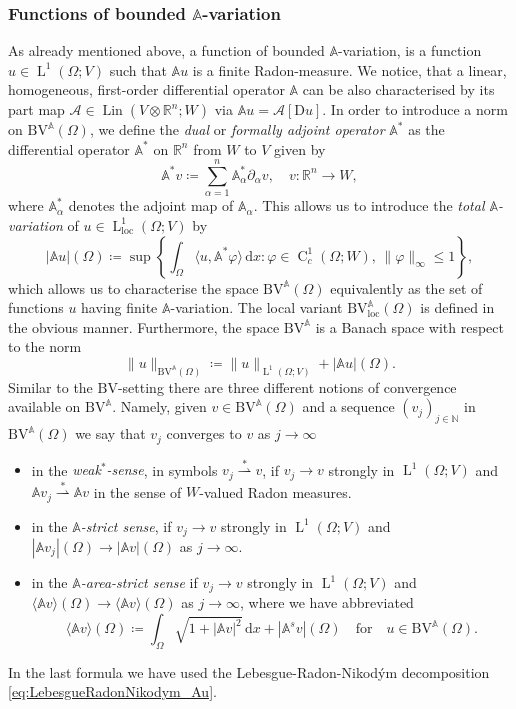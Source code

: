 \documentclass[a4paper,10pt,reqno,oneside]{amsart}
\numberwithin{equation}{section}
\newcommand{\R}{\mathbb R}
\newcommand{\N}{\mathbb N}
\newcommand{\A}{\mathscr{A}}
\newcommand{\Aop}{\mathbb{A}}
\newcommand{\lebe}{\operatorname{L}}
\newcommand{\hold}{\operatorname{C}}
\newcommand{\BV}{\mathrm{BV}}
\newcommand{\loc}{\mathrm{loc}}
\newcommand{\D}{\mathrm{D}}
\DeclareMathOperator{\Lin}{Lin}
\newcommand{\dx}[1]{\,\mathrm{d}#1}
\newcommand{\del}{\partial}
\newcommand{\abs}[1]{\left\lvert#1\right\rvert}
\newcommand{\weakstar}{\overset{\ast}{\rightharpoonup}}
\begin{document}
\subsubsection{Functions of bounded $\Aop$-variation}
As already mentioned above, a function of bounded $\Aop$-variation, is a function $u\in\lebe^1(\Omega;V)$ such that $\Aop u$ is a finite Radon-measure. We notice, that a linear, homogeneous, first-order differential operator $\Aop$ can be also characterised by its part map $\A\in\Lin(V\otimes \R^n; W)$ via $\Aop u = \A[\D u ]$. 
In order to introduce a norm on $\BV^\Aop(\Omega)$, we define the \emph{dual} or \emph{formally adjoint operator} $\Aop^\ast$ as the differential operator $\Aop^\ast$ on $\R^n$ from $W$ to $V$ given by
\begin{equation*}
	\Aop^\ast v\coloneqq\sum_{\alpha=1}^n \Aop_\alpha^\ast \del_\alpha v,\quad v\colon \R^n\to W,
\end{equation*}
where $\Aop_\alpha^\ast$ denotes the adjoint map of $\Aop_\alpha$. This allows us to introduce the \emph{total \(\Aop\)-variation} of \(u \in \lebe^1_{\mathrm{loc}}(\Omega; V)\) by
\begin{equation*}
	|\Aop u|(\Omega) \coloneqq \sup \left\{ \int_{\Omega} \langle u, \Aop^\ast \varphi \rangle \dx{x}\colon \varphi \in \hold^1_c(\Omega; W), \, \|\varphi\|_{\infty} \leq 1 \right\},
\end{equation*}
which allows us to characterise the space \(\BV^\Aop(\Omega)\) equivalently as the set of functions \(u\) having finite \(\Aop\)-variation.
 The local variant $\BV^\Aop_\loc(\Omega)$ is defined in the obvious manner. Furthermore, the space $\BV^\Aop$ is a Banach space with respect to the norm
\begin{equation*}
	\|u\|_{\BV^\Aop(\Omega)}\coloneqq \|u\|_{\lebe^1(\Omega;V)} + \abs{\Aop u}(\Omega).
\end{equation*}
Similar to the $\BV$-setting there are three different notions of convergence available on $\BV^\Aop$. Namely, given $v\in \BV^\Aop(\Omega)$ and a sequence $(v_j)_{j\in\N}$ in  $\BV^\Aop(\Omega)$ we say that $v_j$ converges to $v$ as $j\to\infty$
	\begin{itemize}
	\item in the \emph{weak$^\ast$-sense}, in symbols $v_j\weakstar v$, if $v_j\to v$ strongly in $\lebe^1(\Omega;V)$ and $\Aop v_j \weakstar \Aop v$ in the sense of $W$-valued Radon measures.
	\item in the \emph{$\Aop$-strict sense}, if $v_j\to v$ strongly in $\lebe^1(\Omega;V)$ and $\abs{\Aop v_j}(\Omega)\to \abs{\Aop v}(\Omega)$ as $j\to \infty$.
	\item in the \emph{$\Aop$-area-strict sense} if $v_j\to v$ strongly in $\lebe^1(\Omega;V)$ and $\langle\Aop v\rangle(\Omega)\to \langle \Aop v\rangle(\Omega)$ as $j\to \infty$, where we have abbreviated
	\begin{equation*}
		\langle \Aop v\rangle (\Omega)\coloneqq  \int_\Omega \sqrt{1+\abs{\Aop v}^2}\dx{x} +\abs{\Aop^s v}(\Omega)\quad\mbox{for}\quad u\in \BV^\Aop(\Omega).
	\end{equation*} 
	\end{itemize}
	In the last formula we have used the Lebesgue-Radon-Nikod\'ym decomposition \eqref{eq:LebesgueRadonNikodym_Au}.
\end{document}
